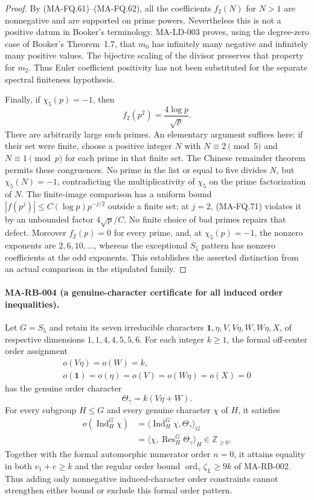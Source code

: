 \begin{proof}
By (MA-FQ.61)--(MA-FQ.62), all the coefficients $f_2(N)$
for $N>1$ are nonnegative and are supported on prime powers.
Nevertheless this is not a positive datum in Booker's
terminology.  MA-LD-003 proves, using the degree-zero case
of Booker's Theorem~1.7, that $m_0$ has infinitely many
negative and infinitely many positive values.  The bijective
scaling of the divisor preserves that property for $m_2$.
Thus Euler coefficient positivity has not been substituted
for the separate spectral finiteness hypothesis.

Finally, if $\chi_5(p)=-1$, then
\[
                    f_2(p^2)=\frac{4\log p}{\sqrt p}.
 \tag{MA-FQ.71}
\]
There are arbitrarily large such primes.  An elementary
argument suffices here: if their set were finite, choose
a positive integer $N$ with $N\equiv2\pmod5$ and
$N\equiv1\pmod p$ for each prime in that finite set.
The Chinese remainder theorem permits these congruences.
No prime in the list or equal to five divides $N$, but
$\chi_5(N)=-1$, contradicting the multiplicativity of
$\chi_5$ on the prime factorization of $N$.
The finite-image comparison has a uniform bound
$|f(p^j)|\le C(\log p)p^{-j/2}$ outside a finite set;
at $j=2$, (MA-FQ.71) violates it by an unbounded factor
$4\sqrt p/C$.  No finite choice of bad primes repairs
that defect.  Moreover $f_2(p)=0$ for every prime,
and, at $\chi_5(p)=-1$, the nonzero exponents are
$2,6,10,\ldots$, whereas the exceptional $S_5$ pattern
has nonzero coefficients at the odd exponents.  This
establishes the asserted distinction from an actual
comparison in the stipulated family.
\end{proof}

\paragraph{MA-RB-004 (a genuine-character certificate for all induced order inequalities).}
Let $G=S_5$ and retain its seven irreducible characters
$\mathbf1,\eta,V,V\eta,W,W\eta,X$, of respective dimensions
$1,1,4,4,5,5,6$.  For each integer $k\ge1$, the formal
off-center order assignment
\[
 \begin{gathered}
 o(V\eta)=o(W)=k,\\
 o(\mathbf1)=o(\eta)=o(V)=o(W\eta)=o(X)=0
 \end{gathered}
 \tag{MA-RB.40}
\]
has the genuine order character
\[
                    \Theta_\gamma=k(V\eta+W).
 \tag{MA-RB.41}
\]
For every subgroup $H\le G$ and every genuine character
$\chi$ of $H$, it satisfies
\[
 \begin{aligned}
 o(\operatorname{Ind}_H^G\chi)
   &=\langle\operatorname{Ind}_H^G\chi,\Theta_\gamma\rangle_G\\
   &=\langle\chi,\operatorname{Res}_H^G\Theta_\gamma\rangle_H
      \in\mathbb Z_{\ge0}.
 \end{aligned}
 \tag{MA-RB.42}
\]
Together with the formal automorphic numerator order $n=0$,
it attains equality in both $v_1+e\ge k$ and the regular
order bound $\operatorname{ord}_\gamma\zeta_L\ge9k$ of
MA-RB-002.  Thus adding only nonnegative induced-character
order constraints cannot strengthen either bound or exclude
this formal order pattern.

